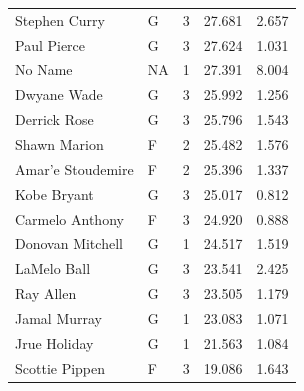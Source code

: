 \begin{table}[t]
\begin{tabular*}{\linewidth}{@{\extracolsep{\fill}}llcrr}
Stephen Curry & G & 3 & 27.681 & 2.657 \\ 
Paul Pierce & G & 3 & 27.624 & 1.031 \\ 
No Name & NA & 1 & 27.391 & 8.004 \\ 
Dwyane Wade & G & 3 & 25.992 & 1.256 \\ 
Derrick Rose & G & 3 & 25.796 & 1.543 \\ 
Shawn Marion & F & 2 & 25.482 & 1.576 \\ 
Amar'e Stoudemire & F & 2 & 25.396 & 1.337 \\ 
Kobe Bryant & G & 3 & 25.017 & 0.812 \\ 
Carmelo Anthony & F & 3 & 24.920 & 0.888 \\ 
Donovan Mitchell & G & 1 & 24.517 & 1.519 \\ 
LaMelo Ball & G & 3 & 23.541 & 2.425 \\ 
Ray Allen & G & 3 & 23.505 & 1.179 \\ 
Jamal Murray & G & 1 & 23.083 & 1.071 \\ 
Jrue Holiday & G & 1 & 21.563 & 1.084 \\ 
Scottie Pippen & F & 3 & 19.086 & 1.643 \\ 
\bottomrule
\end{tabular*}
\end{table}

